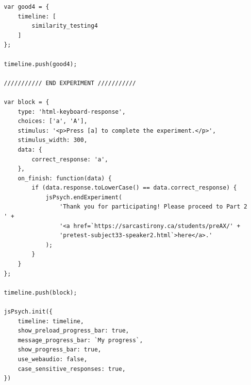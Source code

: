 \documentclass{scrreprt}
\begin{document}
\begin{lstlisting}[style=htmlcssjs]
var good4 = {
    timeline: [
        similarity_testing4
    ]
};

timeline.push(good4);

/////////// END EXPERIMENT ///////////

var block = {
    type: 'html-keyboard-response',
    choices: ['a', 'A'],
    stimulus: '<p>Press [a] to complete the experiment.</p>',
    stimulus_width: 300,
    data: {
        correct_response: 'a',
    },
    on_finish: function(data) {
        if (data.response.toLowerCase() == data.correct_response) {
            jsPsych.endExperiment(
                'Thank you for participating! Please proceed to Part 2 ' +
                '<a href=`https://sarcastirony.ca/students/preAX/' +
                'pretest-subject33-speaker2.html`>here</a>.'
            );
        }
    }
};

timeline.push(block);

jsPsych.init({
    timeline: timeline,
    show_preload_progress_bar: true,
    message_progress_bar: `My progress`,
    show_progress_bar: true,
    use_webaudio: false,
    case_sensitive_responses: true,
})
\end{lstlisting}
\end{document}
